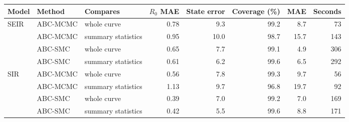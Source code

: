 \begin{tabular}{lllrrrrr}
\toprule
Model & Method & Compares & $R_0$ MAE & State error & Coverage (\%) & MAE & Seconds \\
\midrule
SEIR & ABC-MCMC & whole curve & 0.78 & 9.3 & 99.2 & 8.7 & 73 \\
 & ABC-MCMC & summary statistics & 0.95 & 10.0 & 98.7 & 15.7 & 143 \\
 & ABC-SMC & whole curve & 0.65 & 7.7 & 99.1 & 4.9 & 306 \\
 & ABC-SMC & summary statistics & 0.61 & 6.2 & 99.6 & 6.5 & 292 \\
\midrule
SIR & ABC-MCMC & whole curve & 0.56 & 7.8 & 99.3 & 9.7 & 56 \\
 & ABC-MCMC & summary statistics & 1.13 & 9.7 & 96.8 & 19.7 & 92 \\
 & ABC-SMC & whole curve & 0.39 & 7.0 & 99.2 & 7.0 & 169 \\
 & ABC-SMC & summary statistics & 0.42 & 5.5 & 99.6 & 8.8 & 171 \\
\bottomrule
\end{tabular}
